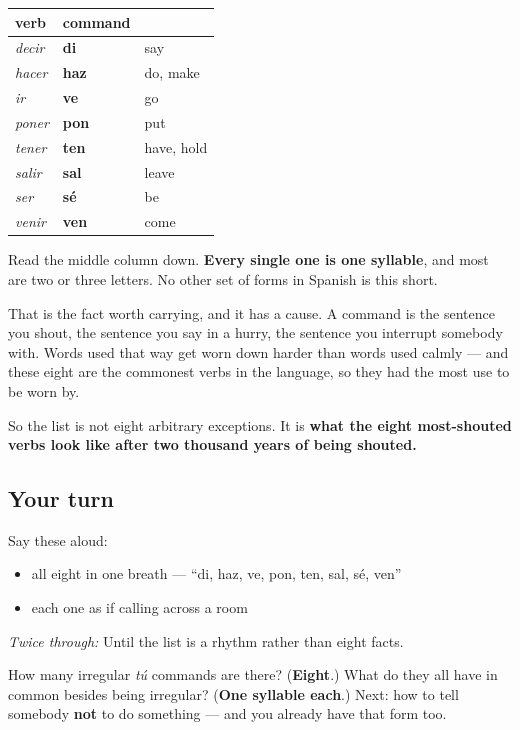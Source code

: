 \begin{grammarlens}[title={Grammar Lens: eight, all one syllable}]
\noindent
\begin{tabularx}{\linewidth}{@{}>{\raggedright\arraybackslash}X>{\raggedright\arraybackslash}X>{\raggedright\arraybackslash}X@{}}
\toprule
\textbf{verb} & \textbf{command} & \textbf{} \\
\midrule
\emph{decir} & \textbf{di} & say \\
\emph{hacer} & \textbf{haz} & do, make \\
\emph{ir} & \textbf{ve} & go \\
\emph{poner} & \textbf{pon} & put \\
\emph{tener} & \textbf{ten} & have, hold \\
\emph{salir} & \textbf{sal} & leave \\
\emph{ser} & \textbf{sé} & be \\
\emph{venir} & \textbf{ven} & come \\
\bottomrule
\end{tabularx}

Read the middle column down. \textbf{Every single one is one syllable}, and most are two or three letters. No other set of forms in Spanish is this short.

That is the fact worth carrying, and it has a cause. A command is the sentence you shout, the sentence you say in a hurry, the sentence you interrupt somebody with. Words used that way get worn down harder than words used calmly — and these eight are the commonest verbs in the language, so they had the most use to be worn by.

So the list is not eight arbitrary exceptions. It is \textbf{what the eight most-shouted verbs look like after two thousand years of being shouted.}
\end{grammarlens}

\subsection*{Your turn}
Say these aloud:

\begin{itemize}
\raggedright
  \item all eight in one breath — \textquotedblleft{}di, haz, ve, pon, ten, sal, sé, ven\textquotedblright{}
  \item each one as if calling across a room
\end{itemize}

\emph{Twice through:} Until the list is a rhythm rather than eight facts.

\begin{tcolorbox}[breakable,colback=teal!4,colframe=teal!35!black,title={Before you move on}]
How many irregular \emph{tú} commands are there? (\textbf{Eight}.) What do they all have in common besides being irregular? (\textbf{One syllable each}.) Next: how to tell somebody \textbf{not} to do something — and you already have that form too.
\end{tcolorbox}
